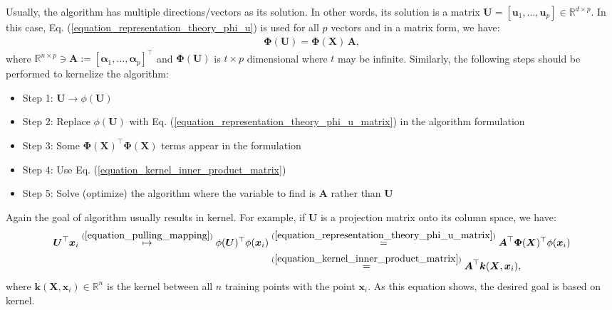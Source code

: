\documentclass[lang=cn,10pt]{gorgeousnbook}
\numberwithin{equation}{section}%
\numberwithin{figure}{section}%
\begin{document}
Usually, the algorithm has multiple directions/vectors as its solution. In other words, its solution is a matrix $\boldsymbol{U} = [\boldsymbol{u}_1, \dots, \boldsymbol{u}_p] \in \mathbb{R}^{d \times p}$. In this case, Eq. (\ref{equation_representation_theory_phi_u}) is used for all $p$ vectors and in a matrix form, we have:
\begin{align}\label{equation_representation_theory_phi_u_matrix}
\boldsymbol{\Phi}(\boldsymbol{U}) = \boldsymbol{\Phi}(\boldsymbol{X})\, \boldsymbol{A}, 
\end{align}
where $\mathbb{R}^{n \times p} \ni \boldsymbol{A} := [\boldsymbol{\alpha}_1, \dots, \boldsymbol{\alpha}_p]^\top$ and $\boldsymbol{\Phi}(\boldsymbol{U})$ is $t \times p$ dimensional where $t$ may be infinite. Similarly, the following steps should be performed to kernelize the algorithm:
\begin{itemize}[topsep=0pt,itemsep=-1ex,partopsep=1ex,parsep=1ex]
\item Step 1: $\boldsymbol{U} \rightarrow \phi(\boldsymbol{U})$
\item Step 2: Replace $\phi(\boldsymbol{U})$ with Eq. (\ref{equation_representation_theory_phi_u_matrix}) in the algorithm formulation
\item Step 3: Some $\boldsymbol{\Phi}(\boldsymbol{X})^\top \boldsymbol{\Phi}(\boldsymbol{X})$ terms appear in the formulation
\item Step 4: Use Eq. (\ref{equation_kernel_inner_product_matrix})
\item Step 5: Solve (optimize) the algorithm where the variable to find is $\boldsymbol{A}$ rather than $\boldsymbol{U}$
\end{itemize}
Again the goal of algorithm usually results in kernel. For example, if $\boldsymbol{U}$ is a projection matrix onto its column space, we have:
\begin{align}
\boldsymbol{U}^\top \boldsymbol{x}_i \overset{(\ref{equation_pulling_mapping})}{\mapsto} \phi(\boldsymbol{U})^\top \phi(\boldsymbol{x}_i) &\overset{(\ref{equation_representation_theory_phi_u_matrix})}{=} \boldsymbol{A}^\top \boldsymbol{\Phi}(\boldsymbol{X})^\top \phi(\boldsymbol{x}_i) \nonumber \\
&\overset{(\ref{equation_kernel_inner_product_matrix})}{=} \boldsymbol{A}^\top \boldsymbol{k}(\boldsymbol{X}, \boldsymbol{x}_i),
\end{align}
where $\boldsymbol{k}(\boldsymbol{X}, \boldsymbol{x}_i) \in \mathbb{R}^n$ is the kernel between all $n$ training points with the point $\boldsymbol{x}_i$.
As this equation shows, the desired goal is based on kernel. 
\end{document}
